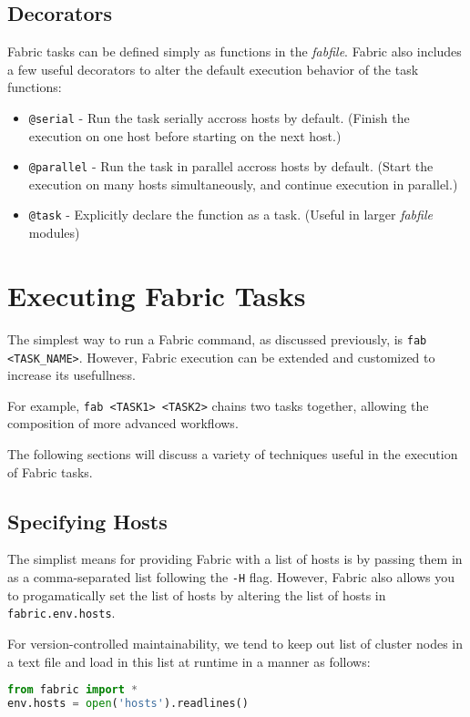 \documentclass[9pt,twocolumn,twoside]{idsi}
\begin{document}
\subsection{Decorators}
Fabric tasks can be defined simply as functions in the \emph{fabfile}. Fabric also includes a few useful decorators to alter the default execution behavior of the task functions:
\begin{itemize}
  \item \texttt{@serial} - Run the task serially accross hosts by default. (Finish the execution on one host before starting on the next host.)
  \item \texttt{@parallel} - Run the task in parallel accross hosts by default. (Start the execution on many hosts simultaneously, and continue execution in parallel.)
  \item \texttt{@task} - Explicitly declare the function as a task. (Useful in larger \emph{fabfile} modules)
\end{itemize}

\section{Executing Fabric Tasks}
The simplest way to run a Fabric command, as discussed previously, is \texttt{fab <TASK\_NAME>}. However, Fabric execution can be extended and customized to increase its usefullness.

For example, \texttt{fab <TASK1> <TASK2>} chains two tasks together, allowing the composition of more advanced workflows.

The following sections will discuss a variety of techniques useful in the execution of Fabric tasks. 

\subsection{Specifying Hosts}
The simplist means for providing Fabric with a list of hosts is by passing them in as a comma-separated list following the \texttt{-H} flag. However, Fabric also allows you to progamatically set the list of hosts by altering the list of hosts in \texttt{fabric.env.hosts}.

For version-controlled maintainability, we tend to keep out list of cluster nodes in a text file and load in this list at runtime in a manner as follows:
\begin{lstlisting}[language=Python, showstringspaces=false]
from fabric import *
env.hosts = open('hosts').readlines()
\end{lstlisting}
\end{document}
